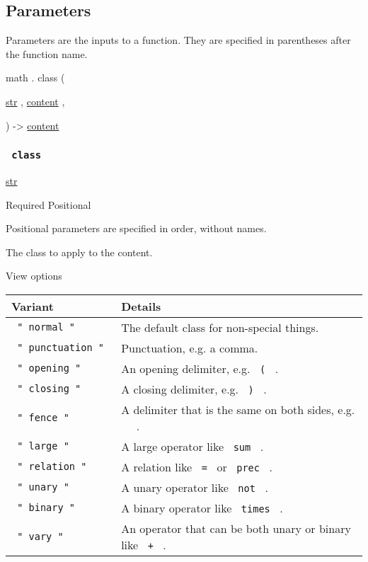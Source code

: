 \subsection{\texorpdfstring{{ Parameters
}}{ Parameters }}\label{parameters}

\label{parameters-tooltip}
Parameters are the inputs to a function. They are specified in
parentheses after the function name.

math { . } { class } (

{ \href{/docs/reference/foundations/str/}{str} , } {
\href{/docs/reference/foundations/content/}{content} , }

) -\textgreater{} \href{/docs/reference/foundations/content/}{content}

\subsubsection{\texorpdfstring{\texttt{\ class\ }}{ class }}\label{parameters-class}

\href{/docs/reference/foundations/str/}{str}

{Required} {{ Positional }}

\label{parameters-class-positional-tooltip}
Positional parameters are specified in order, without names.

The class to apply to the content.


View options

\begin{longtable}[]{@{}ll@{}}
\toprule\noalign{}
Variant & Details \\
\midrule\noalign{}
\endhead
\bottomrule\noalign{}
\endlastfoot
\texttt{\ "\ normal\ "\ } & The default class for non-special things. \\
\texttt{\ "\ punctuation\ "\ } & Punctuation, e.g. a comma. \\
\texttt{\ "\ opening\ "\ } & An opening delimiter, e.g. \texttt{\ (\ }
. \\
\texttt{\ "\ closing\ "\ } & A closing delimiter, e.g. \texttt{\ )\ }
. \\
\texttt{\ "\ fence\ "\ } & A delimiter that is the same on both sides,
e.g. \texttt{\ \textbar{}\ } . \\
\texttt{\ "\ large\ "\ } & A large operator like \texttt{\ sum\ } . \\
\texttt{\ "\ relation\ "\ } & A relation like \texttt{\ =\ } or
\texttt{\ prec\ } . \\
\texttt{\ "\ unary\ "\ } & A unary operator like \texttt{\ not\ } . \\
\texttt{\ "\ binary\ "\ } & A binary operator like \texttt{\ times\ }
. \\
\texttt{\ "\ vary\ "\ } & An operator that can be both unary or binary
like \texttt{\ +\ } . \\
\end{longtable}

